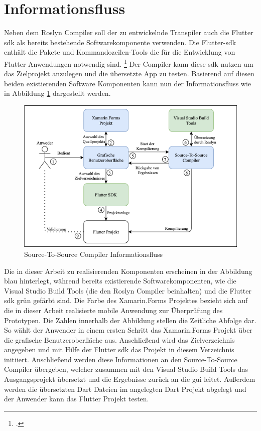\section{Informationsfluss}
Neben dem Roslyn Compiler soll der zu entwickelnde Transpiler auch die Flutter \ac{sdk}  als bereits bestehende Softwarekomponente verwenden.  Die Flutter-\ac{sdk} enthält die Pakete und Kommandozeilen-Tools die für die Entwicklung von Flutter Anwendungen notwendig sind.  \footcite[Vgl.][Abgerufen am \today]{GoogleFlutterSDK} Der Compiler kann diese \ac{sdk} nutzen um das Zielprojekt anzulegen und die übersetzte App zu testen.  Basierend auf diesen beiden existierenden Software Komponenten kann nun der Informationsfluss wie in Abbildung \ref{fig:Informationflow} dargestellt werden. 

\begin{figure}[!ht]
 \includegraphics[width=\textwidth,keepaspectratio]{Images/Implementation/IDE.png}
 \caption{Source-To-Source Compiler Informationsfluss}
 \label{fig:Informationflow}
\end{figure}

Die in dieser Arbeit zu realisierenden Komponenten erscheinen in der Abbildung blau hinterlegt,  während bereits existierende Softwarekomponenten, wie die \glq Visual Studio Build Tools\grq{} (die den Roslyn Compiler beinhalten) und die Flutter \ac{sdk} grün gefärbt sind.  Die Farbe des Xamarin.Forms Projektes bezieht sich auf die in dieser Arbeit realisierte mobile Anwendung zur Überprüfung des Prototypen.  Die Zahlen innerhalb der Abbildung stellen die Zeitliche Abfolge dar.  So wählt der Anwender in einem ersten Schritt das Xamarin.Forms Projekt über die grafische Benutzeroberfläche aus.  Anschließend wird das Zielverzeichnis angegeben und mit Hilfe der Flutter \ac{sdk} das Projekt in diesem Verzeichnis initiiert.  Anschließend werden diese Informationen an den Source-To-Source Compiler übergeben, welcher zusammen mit den Visual Studio Build Tools das Ausgangsprojekt übersetzt und die Ergebnisse zurück an die \ac{gui} leitet.  Außerdem werden die übersetzten Dart Dateien im angelegten Dart Projekt abgelegt und der Anwender kann das Flutter Projekt testen.  

